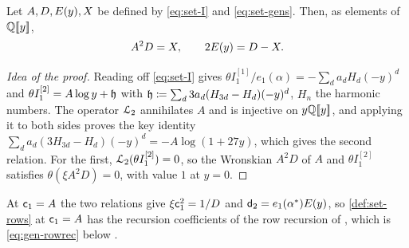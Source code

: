 \begin{prop}
\label{prop:row-modrel}
Let $A,D,E(y),X$ be defined by \eqref{eq:set-I} and \eqref{eq:set-gens}. Then, as elements of $\mathbb{Q}[\![ y ]\!]$,
\[
A^2D=X,\qquad2E(y)=D-X.
\]
\end{prop}

\begin{proof}[Idea of the proof]
Reading off \eqref{eq:set-I} gives $\theta I_1^{[1]}/e_1(\alpha)=-\sum_da_dH_d(-y)^d$ and $\theta I_1^{[2]}=A\log y+\mathfrak{h}$ with $\mathfrak{h}\coloneqq\sum_d3a_d(H_{3d}-H_d)(-y)^d$, $H_n$ the harmonic numbers. The operator $\mathcal{L}_{2}$ annihilates $A$ and is injective on $y\mathbb{Q}[\![ y ]\!]$, and applying it to both sides proves the key identity $\sum_da_d(3H_{3d}-H_d)(-y)^d=-A\log(1+27y)$, which gives the second relation. For the first, $\mathcal{L}_{2}(\theta I_1^{[2]})=0$, so the Wronskian $A^2D$ of $A$ and $\theta I_1^{[2]}$ satisfies $\theta(\xi A^2D)=0$, with value $1$ at $y=0$.
\end{proof}

At $\mathsf{c}_{1}=A$ the two relations give $\xi\mathsf{c}_{1}^2=1/D$ and $\mathsf{d}_{2}=e_1(\alpha^*)E(y)$, so \cref{def:set-rows} at $\mathsf{c}_{1}=A$ has the recursion coefficients of the row recursion of \cite{BS}, which is \eqref{eq:gen-rowrec} below .
